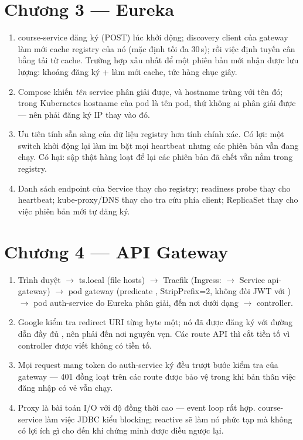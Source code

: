 \section*{Chương 3 --- Eureka}
\begin{enumerate}
  \item course-service đăng ký (POST) lúc khởi động; discovery client
  của gateway làm mới cache registry của nó (mặc định tối đa
  30\,s); rồi việc định tuyến cân bằng tải từ cache. Trường hợp xấu
  nhất để một phiên bản mới nhận được lưu lượng: khoảng đăng ký + làm
  mới cache, tức hàng chục giây.
  \item Compose khiến \emph{tên} service phân giải được, và hostname
  trùng với tên đó; trong Kubernetes hostname của pod là tên pod, thứ
  không ai phân giải được --- nên phải đăng ký IP thay vào đó.
  \item Ưu tiên tính sẵn sàng của dữ liệu registry hơn tính chính xác.
  Có lợi: một switch khởi động lại làm im bặt mọi heartbeat nhưng các
  phiên bản vẫn đang chạy. Có hại: sập thật hàng loạt để lại các phiên
  bản đã chết vẫn nằm trong registry.
  \item Danh sách endpoint của Service thay cho registry; readiness
  probe thay cho heartbeat; kube-proxy/DNS thay cho tra cứu phía
  client; ReplicaSet thay cho việc phiên bản mới tự đăng ký.
\end{enumerate}

\section*{Chương 4 --- API Gateway}
\begin{enumerate}
  \item Trình duyệt $\rightarrow$ ts.local (file hosts) $\rightarrow$
  Traefik (Ingress:  $\rightarrow$ Service api-gateway)
  $\rightarrow$ pod gateway (predicate ,
  StripPrefix=2, không đòi JWT với ) $\rightarrow$
  pod auth-service do Eureka phân giải, đến nơi dưới dạng 
  $\rightarrow$ controller.
  \item Google kiểm tra redirect URI từng byte một; nó đã được đăng
  ký với đường dẫn đầy đủ , nên phải đến nơi
  nguyên vẹn. Các route API thì cắt tiền tố vì controller được viết
  không có tiền tố.
  \item Mọi request mang token do auth-service ký đều trượt bước kiểm
  tra của gateway --- 401 đồng loạt trên các route được bảo vệ trong
  khi bản thân việc đăng nhập có vẻ vẫn chạy.
  \item Proxy là bài toán I/O với độ đồng thời cao --- event loop rất
  hợp. course-service làm việc JDBC kiểu blocking; reactive sẽ làm nó
  phức tạp mà không có lợi ích gì cho đến khi chứng minh được điều
  ngược lại.
\end{enumerate}


